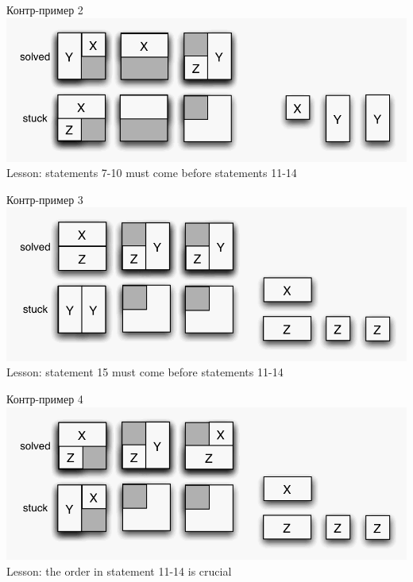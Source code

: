 \documentclass[aspectratio=169
  , xcolor={svgnames}
  , hyperref={ colorlinks,citecolor=DeepPink4
             , linkcolor=DarkRed,urlcolor=DarkBlue}
  , russian
  ]{beamer}
\theoremstyle{exerciseStyle1}
\begin{document}
\begin{frame}[fragile]{Контр-пример 2}
\includegraphics[width=0.9\paperwidth]{figures/ce2.png}
Lesson: statements 7-10 must come before statements 11-14
\end{frame}

\begin{frame}[fragile]{Контр-пример 3}
\includegraphics[width=0.9\paperwidth]{figures/ce3.png}
Lesson: statement 15 must come before statements 11-14
\end{frame}

\begin{frame}[fragile]{Контр-пример 4}
\includegraphics[width=0.9\paperwidth]{figures/ce4.png}
Lesson: the order in statement 11-14 is crucial
\end{frame}
\end{document}

